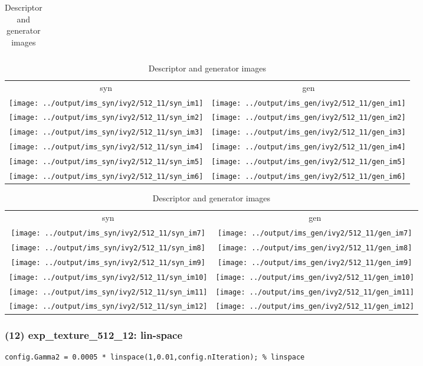\documentclass[letter]{article}
\begin{document}
\begin{table}[h!]
\begin{tabular}{c}
	\end{tabular}
	\begin{tabular}{cc}
		syn & gen\tabularnewline
		\texttt{[image: ../output/ims\_syn/ivy2/512\_11/syn\_im1]} & \texttt{[image: ../output/ims\_gen/ivy2/512\_11/gen\_im1]} \tabularnewline
		\texttt{[image: ../output/ims\_syn/ivy2/512\_11/syn\_im2]} & \texttt{[image: ../output/ims\_gen/ivy2/512\_11/gen\_im2]} \tabularnewline
		\texttt{[image: ../output/ims\_syn/ivy2/512\_11/syn\_im3]} & \texttt{[image: ../output/ims\_gen/ivy2/512\_11/gen\_im3]} \tabularnewline
		\texttt{[image: ../output/ims\_syn/ivy2/512\_11/syn\_im4]} & \texttt{[image: ../output/ims\_gen/ivy2/512\_11/gen\_im4]} \tabularnewline
		\texttt{[image: ../output/ims\_syn/ivy2/512\_11/syn\_im5]} & \texttt{[image: ../output/ims\_gen/ivy2/512\_11/gen\_im5]} \tabularnewline
		\texttt{[image: ../output/ims\_syn/ivy2/512\_11/syn\_im6]} & \texttt{[image: ../output/ims\_gen/ivy2/512\_11/gen\_im6]} \tabularnewline
	\end{tabular}
	\begin{tabular}{cc}
		syn & gen\tabularnewline
		\texttt{[image: ../output/ims\_syn/ivy2/512\_11/syn\_im7]} & \texttt{[image: ../output/ims\_gen/ivy2/512\_11/gen\_im7]} \tabularnewline
		\texttt{[image: ../output/ims\_syn/ivy2/512\_11/syn\_im8]} & \texttt{[image: ../output/ims\_gen/ivy2/512\_11/gen\_im8]} \tabularnewline
		\texttt{[image: ../output/ims\_syn/ivy2/512\_11/syn\_im9]} & \texttt{[image: ../output/ims\_gen/ivy2/512\_11/gen\_im9]} \tabularnewline
		\texttt{[image: ../output/ims\_syn/ivy2/512\_11/syn\_im10]} & \texttt{[image: ../output/ims\_gen/ivy2/512\_11/gen\_im10]} \tabularnewline
		\texttt{[image: ../output/ims\_syn/ivy2/512\_11/syn\_im11]} & \texttt{[image: ../output/ims\_gen/ivy2/512\_11/gen\_im11]} \tabularnewline
		\texttt{[image: ../output/ims\_syn/ivy2/512\_11/syn\_im12]} & \texttt{[image: ../output/ims\_gen/ivy2/512\_11/gen\_im12]} \tabularnewline
	\end{tabular}
	\caption{Descriptor and generator images}
\end{table}
\newpage

\subsubsection*{(12) exp\_texture\_512\_12: lin-space}

\begin{lstlisting}
config.Gamma2 = 0.0005 * linspace(1,0.01,config.nIteration); % linspace
\end{lstlisting}
\end{document}
